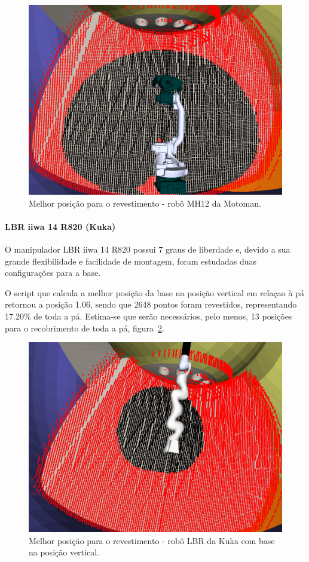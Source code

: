 \begin{figure}[h!]	
	\includegraphics[width=\columnwidth]{figs/bighatch/mh12_bestpos.png}
	\caption{Melhor posição para o revestimento - robô MH12 da Motoman.}
	\label{fig::mh12bestpos}
\end{figure}


\paragraph{LBR iiwa 14 R820 (Kuka)}
O manipulador LBR iiwa 14 R820 possui 7 graus de liberdade e, devido a sua
grande flexibilidade e facilidade de montagem, foram estudadas duas
configurações para a base.

O script que calcula a melhor posição da base na posição vertical em relaçao à
pá retornou a posição 1.06, sendo que 2648 pontos foram revestidos,
representando 17.20\% de toda a pá. Estima-se que serão necessários, pelo menos,
13 posições para o recobrimento de toda a pá, figura~\ref{fig::lbrbestposv}.

\begin{figure}[h!]	
	\includegraphics[width=\columnwidth]{figs/bighatch/lbr_bestposv.png}
	\caption{Melhor posição para o revestimento - robô LBR da Kuka com base na
	posição vertical.}
	\label{fig::lbrbestposv}
\end{figure}

